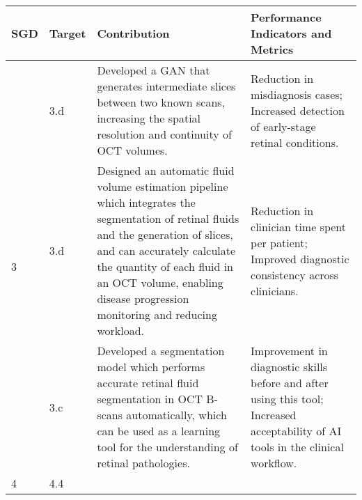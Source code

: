\begin{center}
	\begin{tabular}{|l|l|p{58mm}|p{52mm}|}
		\hline
		\textbf{SGD} & \textbf{Target} & \textbf{Contribution} & \textbf{Performance Indicators and Metrics} \\ 
		\hline
		\hline
		\multirow{3}{*}{3} 
		& 3.d & Developed a GAN that generates intermediate slices between two known scans, increasing the spatial resolution and continuity of OCT volumes. & Reduction in misdiagnosis cases; Increased detection of early-stage retinal conditions.\\
		\cline{2-4}
		& 3.d & Designed an automatic fluid volume estimation pipeline which integrates the segmentation of retinal fluids and the generation of slices, and can accurately calculate the quantity of each fluid in an OCT volume, enabling disease progression monitoring and reducing workload. & Reduction in clinician time spent per patient; Improved diagnostic consistency across clinicians.\\
		\cline{2-4}
		& 3.c & \parbox[t]{58mm}{Developed a segmentation model which performs accurate retinal fluid segmentation in OCT B-scans automatically, which can be used as a learning tool for the understanding of retinal pathologies.} & \parbox[t]{52mm}{Improvement in diagnostic skills before and after using this tool; Increased acceptability of AI tools in the clinical workflow.}\\
		4 & 4.4 & & \\
		\hline
	\end{tabular}
\end{center}